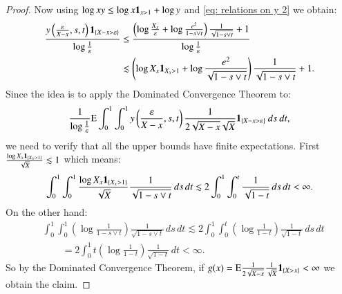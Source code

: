 \begin{proof}
Now using $\log{xy} \leq \log{x} \mathbf{1}_{x> 1} + \log{y}$ and \eqref{eq: relations on y 2} we obtain:
\begin{align*}
    \frac{y\left( \frac{\varepsilon}{X-x}, s,t \right) \mathbf{1}_{\{ X-x > \varepsilon\}}}{ \log{\frac{1}{\varepsilon}}} &\leq \frac{\left( \log{\frac{X_x}{\varepsilon}} + \log{\frac{e^2}{1 - s \vee t}} \right) \frac{1}{\sqrt{1 - s \vee t}} + 1}{\log{\frac{1}{\varepsilon}}} \\ 
    &\lesssim \left( \log{X_x} \mathbf{1}_{X_x > 1} + \log{\frac{e^2}{\sqrt{1 - s \vee t}}}\right) \frac{1}{\sqrt{1 - s \vee t}} + 1.
\end{align*}
Since the idea is to apply the Dominated Convergence Theorem to:
\begin{align*}
    \frac{1}{\log{\frac{1}{\varepsilon}}} \mathrm{E}  \int_{0}^{1} \int_{0}^{1} y\left( \frac{\varepsilon}{X-x},s,t \right) \frac{1}{2\sqrt{X-x} \sqrt{X}} \mathbf{1}_{\{X - x > \varepsilon \}} \: ds \: dt,
\end{align*}
we need to verify that all the upper bounds have finite expectations. First $\frac{\log{X_x}\mathbf{1}_{\{ X_x > 1\}}}{\sqrt{X}} \lesssim 1$ which means:
\begin{align*}
    \int_{0}^{1} \int_{0}^{1} \frac{\log{X_x} \mathbf{1}_{\{X_x > 1\}} }{\sqrt{X}} \frac{1}{\sqrt{1 - s \vee t}} \, ds \, dt \lesssim 2 \int_{0}^{1} \int_{0}^{t} \frac{1}{\sqrt{1-t}} \, ds \, dt < \infty.
\end{align*}
On the other hand:
\begin{align*}
    &\int_{0}^{1} \int_{0}^{1} \left( \log{\frac{1}{1 - s \vee t}} \right) \frac{1}{\sqrt{1 - s \vee t}} \, ds \, dt \lesssim 2 \int_{0}^{1} \int_{0}^{t} \left( \log{\frac{1}{1 - t}}\right) \frac{1}{\sqrt{1-t}} \, ds \, dt \\
    &\quad \quad = 2 \int_{0}^{1} t \left( \log{\frac{1}{1-t}} \right) \frac{1}{\sqrt{1-t}} \, dt < \infty.
\end{align*}
So by the Dominated Convergence Theorem, if $g(x)= \mathrm{E}  \frac{1}{2 \sqrt{X-x}} \frac{1}{\sqrt{X}} \mathbf{1}_{\{X>x \}} < \infty$ we obtain the claim.
\end{proof}

